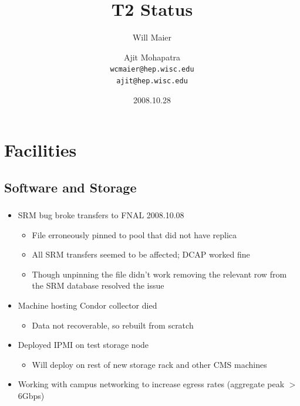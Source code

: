 \documentclass{beamer}
\title{T2 Status}
\author[Maier, Mohapatra]{
    Will Maier \and Ajit Mohapatra\\ 
    {\tt wcmaier@hep.wisc.edu}\\
    {\tt ajit@hep.wisc.edu}}
\institute[Wisconsin]{University of Wisconsin - High Energy Physics}
\date{2008.10.28}
\begin{document}
\begin{frame}
    \titlepage
\end{frame}


\section{Facilities}
\subsection{Software and Storage}
\begin{frame}
\frametitle{}
\begin{itemize}
    \item SRM bug broke transfers to FNAL 2008.10.08
    \begin{itemize}
        \item File erroneously pinned to pool that did not have replica
        \item All SRM transfers seemed to be affected; DCAP worked fine
        \item Though unpinning the file didn't work removing the relevant row from the SRM database resolved the issue
    \end{itemize}
    \item Machine hosting Condor collector died
    \begin{itemize}
        \item Data not recoverable, so rebuilt from scratch
    \end{itemize}
    \item Deployed IPMI on test storage node
    \begin{itemize}
        \item Will deploy on rest of new storage rack and other CMS machines
    \end{itemize}
    \item Working with campus networking to increase egress rates (aggregate peak $>$ 6Gbps)
\end{itemize}
\end{frame}
\end{document}
